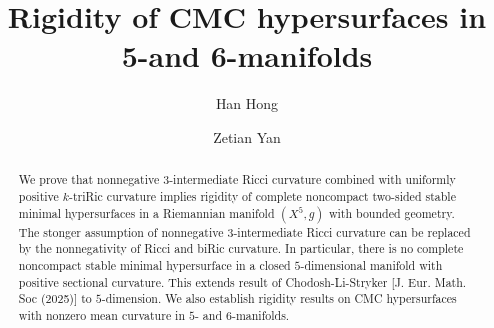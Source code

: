 \documentclass[11pt,letterpaper]{amsart}
\theoremstyle{definition}
\theoremstyle{remark}
\numberwithin{equation}{section}
\begin{document}
\title{Rigidity of CMC hypersurfaces in 5-and 6-manifolds}



\author{Han Hong}
\address{Department of Mathematics and statistics \\ Beijing Jiaotong University \\ Beijing \\ China, 100044}

\author{Zetian Yan}
\address{Department of Mathematics \\ UC Santa Barbara \\ Santa Barbara \\ CA 93106 \\ USA}
\begin{abstract}
 We prove that nonnegative $3$-intermediate Ricci curvature combined with uniformly positive $k$-triRic curvature implies rigidity of complete noncompact two-sided stable minimal hypersurfaces in a Riemannian manifold $(X^5,g)$ with bounded geometry. The stonger assumption of nonnegative $3$-intermediate Ricci curvature can be replaced by the nonnegativity of Ricci and biRic curvature. In particular, there is no complete noncompact stable minimal hypersurface in a closed $5$-dimensional manifold with positive sectional curvature. This extends result of Chodosh-Li-Stryker [J. Eur. Math. Soc (2025)] to $5$-dimension. We also establish rigidity results on CMC hypersurfaces with nonzero mean curvature in $5$- and $6$-manifolds.
\end{abstract}
\maketitle
\end{document}
